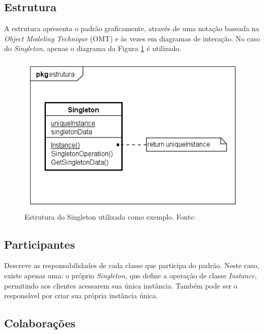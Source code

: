 \subsection*{Estrutura}

A estrutura apresenta o padrão graficamente, através de uma 
notação baseada na \textit{Object Modeling Technique} (OMT) 
e às vezes em diagramas de interação. No caso do \textit{Singleton}, 
apenas o diagrama da Figura \ref{fig_grafico} é utilizado.

\begin{figure}[htb]
	\caption{\label{fig_grafico}Estrutura do Singleton utilizada como exemplo. Fonte: \cite{gamma:1995}}
	\begin{center}
	    \includegraphics[scale=0.6]{5_padroes-contexto-funcional/5.1_criacionais/5.1.5_singleton/singleton_estrutura.png}
    \end{center}
\end{figure}

\subsection*{Participantes}

Descreve as responsabilidades de cada classe que 
participa do padrão. Neste caso, existe 
apenas uma: o próprio \textit{Singleton}, que define 
a operação de classe \textit{Instance}, permitindo aos clientes 
acessarem sua única instância. Também pode ser o 
responsável por criar sua própria instância única.

\subsection*{Colaborações}

